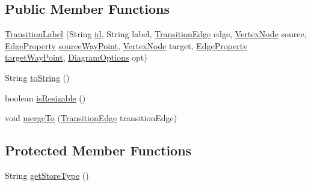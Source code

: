 \subsection*{Public Member Functions}
\begin{DoxyCompactItemize}
\item 
\hyperlink{classorg_1_1tzi_1_1use_1_1gui_1_1views_1_1diagrams_1_1statemachine_1_1_transition_label_aa368a5f567b0569a89a36085dea599da}{Transition\-Label} (String \hyperlink{classorg_1_1tzi_1_1use_1_1gui_1_1views_1_1diagrams_1_1elements_1_1_edge_property_a628f8eb4c55c3973fb61f0d76787ac0b}{id}, String label, \hyperlink{classorg_1_1tzi_1_1use_1_1gui_1_1views_1_1diagrams_1_1statemachine_1_1_transition_edge}{Transition\-Edge} edge, \hyperlink{classorg_1_1tzi_1_1use_1_1gui_1_1views_1_1diagrams_1_1statemachine_1_1_vertex_node}{Vertex\-Node} source, \hyperlink{classorg_1_1tzi_1_1use_1_1gui_1_1views_1_1diagrams_1_1elements_1_1_edge_property}{Edge\-Property} \hyperlink{classorg_1_1tzi_1_1use_1_1gui_1_1views_1_1diagrams_1_1elements_1_1_edge_property_ad4479c503d203ac72635b7655d038e95}{source\-Way\-Point}, \hyperlink{classorg_1_1tzi_1_1use_1_1gui_1_1views_1_1diagrams_1_1statemachine_1_1_vertex_node}{Vertex\-Node} target, \hyperlink{classorg_1_1tzi_1_1use_1_1gui_1_1views_1_1diagrams_1_1elements_1_1_edge_property}{Edge\-Property} \hyperlink{classorg_1_1tzi_1_1use_1_1gui_1_1views_1_1diagrams_1_1elements_1_1_edge_property_a2c52e44c9688446cfcded4a3f779278c}{target\-Way\-Point}, \hyperlink{classorg_1_1tzi_1_1use_1_1gui_1_1views_1_1diagrams_1_1_diagram_options}{Diagram\-Options} opt)
\item 
String \hyperlink{classorg_1_1tzi_1_1use_1_1gui_1_1views_1_1diagrams_1_1statemachine_1_1_transition_label_a6f26d3f44d9735bdab9891d49078f1a9}{to\-String} ()
\item 
boolean \hyperlink{classorg_1_1tzi_1_1use_1_1gui_1_1views_1_1diagrams_1_1statemachine_1_1_transition_label_aa79dc6fbd4822989a096a19aef970094}{is\-Resizable} ()
\item 
void \hyperlink{classorg_1_1tzi_1_1use_1_1gui_1_1views_1_1diagrams_1_1statemachine_1_1_transition_label_a56ddf9d76df564652c13173f2b5dc62f}{merge\-To} (\hyperlink{classorg_1_1tzi_1_1use_1_1gui_1_1views_1_1diagrams_1_1statemachine_1_1_transition_edge}{Transition\-Edge} transition\-Edge)
\end{DoxyCompactItemize}
\subsection*{Protected Member Functions}
\begin{DoxyCompactItemize}
\item 
String \hyperlink{classorg_1_1tzi_1_1use_1_1gui_1_1views_1_1diagrams_1_1statemachine_1_1_transition_label_a86c3c1042939222232d47e4d02841a63}{get\-Store\-Type} ()
\end{DoxyCompactItemize}
